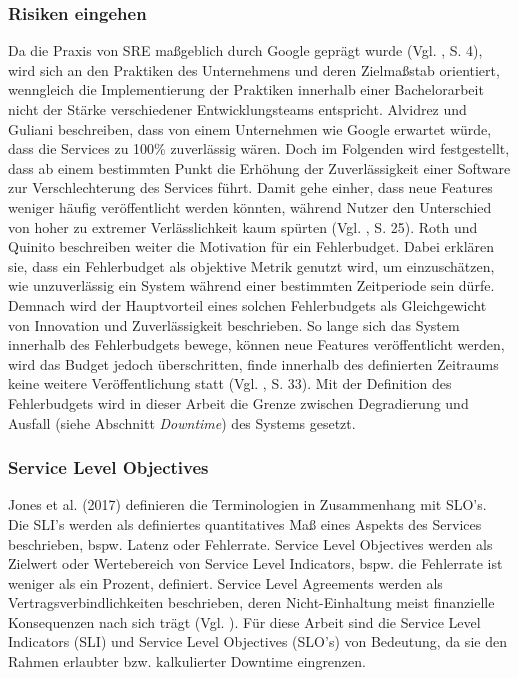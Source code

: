 \documentclass[
12pt,
a4paper,
twoside,
openright
]{report}
\begin{document}
	\subsubsection{Risiken eingehen}
	Da die Praxis von SRE maßgeblich durch Google geprägt wurde (Vgl. \parencite{gopikrishna2025site}, S. 4), wird sich an den Praktiken des Unternehmens und deren Zielmaßstab orientiert, wenngleich die Implementierung der Praktiken innerhalb einer Bachelorarbeit nicht der Stärke verschiedener Entwicklungsteams entspricht. Alvidrez und Guliani beschreiben, dass von einem Unternehmen wie Google erwartet würde, dass die Services zu 100\% zuverlässig wären. Doch im Folgenden wird festgestellt, dass ab einem bestimmten Punkt die Erhöhung der Zuverlässigkeit einer Software zur Verschlechterung des Services führt. Damit gehe einher, dass neue Features weniger häufig veröffentlicht werden könnten, während Nutzer den Unterschied von hoher zu extremer Verlässlichkeit kaum spürten (Vgl. \parencite{GoogleSRE}, S. 25). Roth und Quinito beschreiben weiter die Motivation für ein Fehlerbudget. Dabei erklären sie, dass ein Fehlerbudget als objektive Metrik genutzt wird, um einzuschätzen, wie unzuverlässig ein System während einer bestimmten Zeitperiode sein dürfe. Demnach wird der Hauptvorteil eines solchen Fehlerbudgets als Gleichgewicht von Innovation und Zuverlässigkeit beschrieben. So lange sich das System innerhalb des Fehlerbudgets bewege, können neue Features veröffentlicht werden, wird das Budget jedoch überschritten, finde innerhalb des definierten Zeitraums keine weitere Veröffentlichung statt (Vgl. \parencite{GoogleSRE}, S. 33). Mit der Definition des Fehlerbudgets wird in dieser Arbeit die Grenze zwischen Degradierung und Ausfall (siehe Abschnitt \textit{Downtime}) des Systems gesetzt.
	
	\subsubsection{Service Level Objectives}
	Jones et al. (2017) definieren die Terminologien in Zusammenhang mit SLO's. Die SLI's werden als definiertes quantitatives Maß eines Aspekts des Services beschrieben, bspw. Latenz oder Fehlerrate. Service Level Objectives werden als Zielwert oder Wertebereich von Service Level Indicators, bspw. die Fehlerrate ist weniger als ein Prozent, definiert. Service Level Agreements werden als Vertragsverbindlichkeiten beschrieben, deren Nicht-Einhaltung meist finanzielle Konsequenzen nach sich trägt (Vgl. \parencite{GoogleSREChap4}). Für diese Arbeit sind die Service Level Indicators (SLI) und Service Level Objectives (SLO's) von Bedeutung, da sie den Rahmen erlaubter bzw. kalkulierter Downtime eingrenzen.
	
\end{document}
